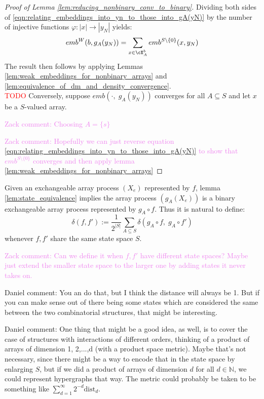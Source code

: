 \documentclass[11pt,oneside,reqno]{article}
\theoremstyle{plain}
\theoremstyle{definition}
\numberwithin{equation}{section}
\renewcommand{\phi}{\varphi}
\newcommand{\N}{\mathbb{N}}
\newcommand{\red}{\textcolor{red}}
\newcommand{\zack}[1]{\textcolor{Violet}{Zack comment: #1}}
\newcommand{\daniel}[1]{\textcolor{Emerald}{Daniel comment: #1}}
\begin{document}
\begin{proof}[Proof of Lemma \ref{lem:reducing_nonbinary_conv_to_binary}]
    Dividing both sides of \eqref{eqn:relating_embeddings_into_yn_to_those_into_gA(yN)} by the number of injective functions $\phi: |x| \to |y_N|$ yields:
    \begin{equation}
          emb^W(b, g_A(y_N)) = \sum_{x \in \cX_A^b} emb^{S \setminus \{0\}}(x, y_N)
    \end{equation}
     The result then follows by applying Lemmas \ref{lem:weak_embeddings_for_nonbinary_arrays} and \ref{lem:equivalence_of_dm_and_density_convergence}.\\


    \noindent \red{TODO} Conversely, suppose $emb(\cdot, \; g_A(y_N))$ converges for all $A \subseteq S$ and let $x$ be a $S$-valued array. 

    \zack{Choosing $A = \{s\}$}
    
    \zack{Hopefully we can just reverse equation \eqref{eqn:relating_embeddings_into_yn_to_those_into_gA(yN)} to show that $emb^{S \setminus \{0\}}$ converges and then apply lemma \ref{lem:weak_embeddings_for_nonbinary_arrays}}


\end{proof}

Given an exchangeable array process $(X_e)$ represented by $f$, lemma \ref{lem:state_equivalence} implies the array process $(g_A(X_e))$ is a binary exchangeable array process represented by $g_A \circ f$. Thus it is natural to define:
%
\begin{equation}
    \delta(f,f') := \frac{1}{2^{|S|}} \sum_{A \subseteq S} \delta(g_A \circ f, \; g_A \circ f')
\end{equation}
%
\noindent whenever $f,f'$ share the same state space $S$. 




\zack{Can we define it when $f,f'$ have different state spaces? Maybe just extend the smaller state space to the larger one by adding states it never takes on. }

\daniel{You an do that, but I think the distance will always be 1. But if you can make sense out of there being some states which are considered the same between the two combinatorial structures, that might be interesting.}

\daniel{One thing that might be a good idea, as well, is to cover the case of structures with interactions of different orders, thinking of a product of arrays of dimension 1, 2,...,d (with a product space metric). Maybe that's not necessary, since there might be a way to encode that in the state space by enlarging $S$, but if we did a product of arrays of dimension $d$ for all $d \in \N$, we could represent hypergraphs that way. The metric could probably be taken to be something like $\sum_{d=1}^\infty 2^{-d} \text{dist}_d$.}
\end{document}
